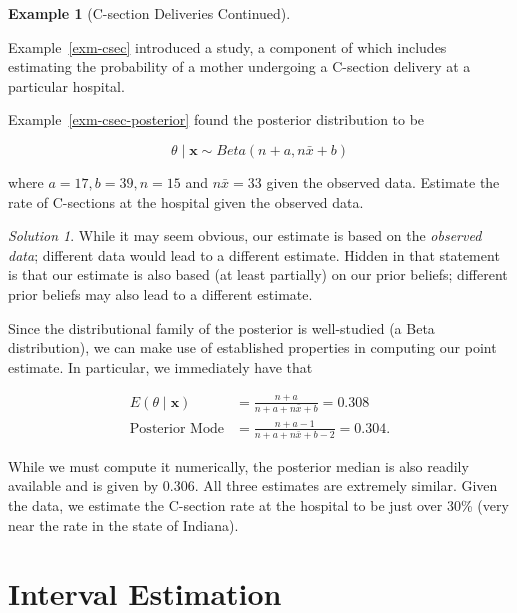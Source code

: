 \documentclass[
  letterpaper,
  DIV=11,
  numbers=noendperiod]{scrreprt}
\theoremstyle{definition}
\theoremstyle{plain}
\theoremstyle{definition}
\newtheorem{example}{Example}[chapter]
\theoremstyle{remark}
\newtheorem*{solution}{Solution}
\begin{document}
\begin{example}[C-section Deliveries
Continued]\protect\hypertarget{exm-csec-point-estimate}{}\label{exm-csec-point-estimate}

Example~\ref{exm-csec} introduced a study, a component of which includes
estimating the probability of a mother undergoing a C-section delivery
at a particular hospital.

Example~\ref{exm-csec-posterior} found the posterior distribution to be

\[\theta \mid \mathbf{x} \sim Beta\left(n + a, n\bar{x} + b\right)\]

where \(a = 17, b = 39, n = 15\) and \(n\bar{x} = 33\) given the
observed data. Estimate the rate of C-sections at the hospital given the
observed data.

\end{example}

\begin{solution}

While it may seem obvious, our estimate is based on the \emph{observed
data}; different data would lead to a different estimate. Hidden in that
statement is that our estimate is also based (at least partially) on our
prior beliefs; different prior beliefs may also lead to a different
estimate.

Since the distributional family of the posterior is well-studied (a Beta
distribution), we can make use of established properties in computing
our point estimate. In particular, we immediately have that

\[
\begin{aligned}
  E\left(\theta \mid \mathbf{x}\right)
    &= \frac{n + a}{n + a + n\bar{x} + b} = 0.308 \\
  \text{Posterior Mode} 
    &= \frac{n + a - 1}{n + a + n\bar{x} + b - 2} = 0.304.
\end{aligned}
\]

While we must compute it numerically, the posterior median is also
readily available and is given by 0.306. All three estimates are
extremely similar. Given the data, we estimate the C-section rate at the
hospital to be just over 30\% (very near the rate in the state of
Indiana).

\end{solution}

\hypertarget{sec-interval-estimation}{%
\chapter{Interval Estimation}\label{sec-interval-estimation}}
\end{document}
